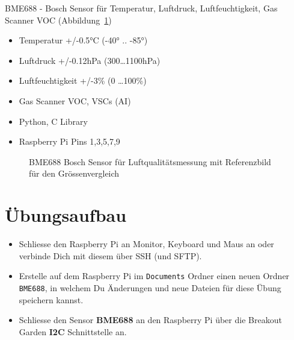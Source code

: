 \documentclass[
  11pt,
  a4paper,
  oneside, openany  ,captions=tableheading
]{scrbook}
\providecommand{\tightlist}{%
  \setlength{\itemsep}{0pt}\setlength{\parskip}{0pt}}
\theoremstyle{remark}
\renewcommand{\markright}[1]{\def\chaptertitle{#1}} %
\begin{document}
\markright{BME688\index{BME688}}

BME688 - Bosch Sensor für Temperatur, Luftdruck, Luftfeuchtigkeit, Gas
Scanner VOC (Abbildung~\ref{fig-bme688})

\begin{itemize}
\tightlist
\item
  Temperatur +/-0.5°C (-40° .. -85°)
\item
  Luftdruck +/-0.12hPa (300\ldots1100hPa)
\item
  Luftfeuchtigkeit +/-3\% (0 \ldots100\%)
\item
  Gas Scanner VOC, VSCs (AI)
\item
  Python, C Library
\item
  Raspberry Pi Pins 1,3,5,7,9
\end{itemize}

\begin{figure}


\caption{\label{fig-bme688}BME688 Bosch Sensor für Luftqualitätsmessung
mit Referenzbild für den Grössenvergleich}

\end{figure}%

\section*{Übungsaufbau}\label{uxfcbungsaufbau}

\markright{Übungsaufbau}

\begin{itemize}
\tightlist
\item
  Schliesse den Raspberry Pi an Monitor, Keyboard und Maus an oder
  verbinde Dich mit diesem über SSH (und SFTP).
\item
  Erstelle auf dem Raspberry Pi im \texttt{Documents} Ordner einen neuen
  Ordner \texttt{BME688}, in welchem Du Änderungen und neue Dateien für
  diese Übung speichern kannst.
\item
  Schliesse den Sensor \textbf{BME688} an den Raspberry Pi über die
  Breakout Garden \textbf{I2C} Schnittstelle an.
\end{itemize}
\end{document}
